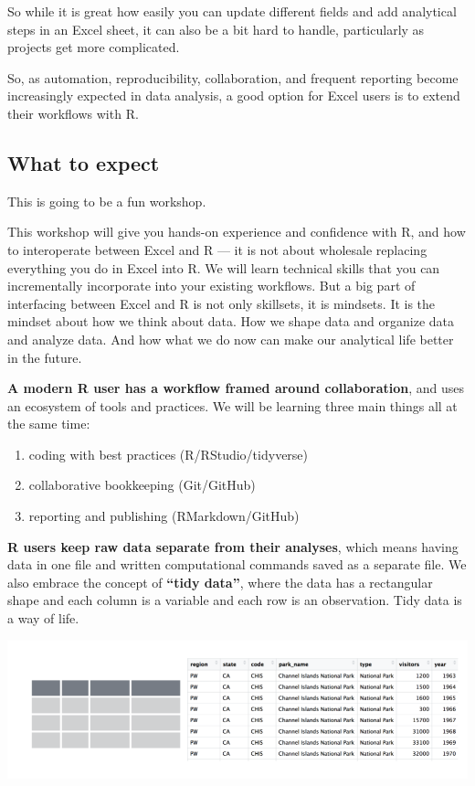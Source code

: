 \documentclass[]{book}
\providecommand{\tightlist}{%
  \setlength{\itemsep}{0pt}\setlength{\parskip}{0pt}}
\begin{document}
So while it is great how easily you can update different fields and add analytical steps in an Excel sheet, it can also be a bit hard to handle, particularly as projects get more complicated.

So, as automation, reproducibility, collaboration, and frequent reporting become increasingly expected in data analysis, a good option for Excel users is to extend their workflows with R.

\hypertarget{what-to-expect}{%
\subsection{What to expect}\label{what-to-expect}}

This is going to be a fun workshop.

This workshop will give you hands-on experience and confidence with R, and how to interoperate between Excel and R --- it is not about wholesale replacing everything you do in Excel into R.
We will learn technical skills that you can incrementally incorporate into your existing workflows. But a big part of interfacing between Excel and R is not only skillsets, it is mindsets. It is the mindset about how we think about data. How we shape data and organize data and analyze data. And how what we do now can make our analytical life better in the future.

\textbf{A modern R user has a workflow framed around collaboration}, and uses an ecosystem of tools and practices. We will be learning three main things all at the same time:

\begin{enumerate}
\def\labelenumi{\arabic{enumi}.}
\tightlist
\item
  coding with best practices (R/RStudio/tidyverse)
\item
  collaborative bookkeeping (Git/GitHub)
\item
  reporting and publishing (RMarkdown/GitHub)
\end{enumerate}

\textbf{R users keep raw data separate from their analyses}, which means having data in one file and written computational commands saved as a separate file. We also embrace the concept of \textbf{``tidy data''}, where the data has a rectangular shape and each column is a variable and each row is an observation. Tidy data is a way of life.

\includegraphics[width=0.7\linewidth]{img/tidy_img_np}
\end{document}
